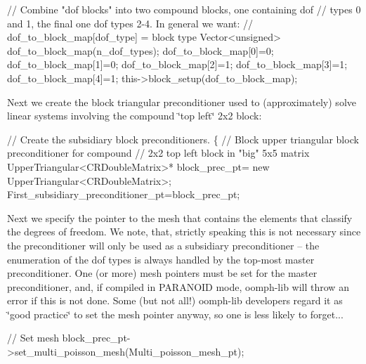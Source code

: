 \begin{DoxyCodeInclude}
  \textcolor{comment}{// Combine "dof blocks" into two compound blocks, one containing dof }
  \textcolor{comment}{// types 0 and 1, the final one dof types 2-4. In general we want:}
  \textcolor{comment}{// dof\_to\_block\_map[dof\_type] = block type}
  Vector<unsigned> dof\_to\_block\_map(n\_dof\_types);
  dof\_to\_block\_map[0]=0;
  dof\_to\_block\_map[1]=0;
  dof\_to\_block\_map[2]=1;
  dof\_to\_block\_map[3]=1;
  dof\_to\_block\_map[4]=1;
  this->block\_setup(dof\_to\_block\_map);

\end{DoxyCodeInclude}


Next we create the block triangular preconditioner used to (approximately) solve linear systems involving the compound \char`\"{}top left\char`\"{} 2x2 block\+: 
\begin{DoxyCodeInclude}
  \textcolor{comment}{// Create the subsidiary block preconditioners.  }
  \{
   \textcolor{comment}{// Block upper triangular block preconditioner for compound }
   \textcolor{comment}{// 2x2 top left block in "big" 5x5 matrix}
   UpperTriangular<CRDoubleMatrix>* block\_prec\_pt=
    \textcolor{keyword}{new} UpperTriangular<CRDoubleMatrix>;
   First\_subsidiary\_preconditioner\_pt=block\_prec\_pt;

\end{DoxyCodeInclude}


Next we specify the pointer to the mesh that contains the elements that classify the degrees of freedom. We note, that, strictly speaking this is not necessary since the preconditioner will only be used as a subsidiary preconditioner -- the enumeration of the dof types is always handled by the top-\/most master preconditioner. One (or more) mesh pointers must be set for the master preconditioner, and, if compiled in {\ttfamily P\+A\+R\+A\+N\+O\+ID} mode, {\ttfamily oomph-\/lib} will throw an error if this is not done. Some (but not all!) {\ttfamily oomph-\/lib} developers regard it as \char`\"{}good practice\char`\"{} to set the mesh pointer anyway, so one is less likely to forget...


\begin{DoxyCodeInclude}
   \textcolor{comment}{// Set mesh}
   block\_prec\_pt->set\_multi\_poisson\_mesh(Multi\_poisson\_mesh\_pt);

\end{DoxyCodeInclude}


